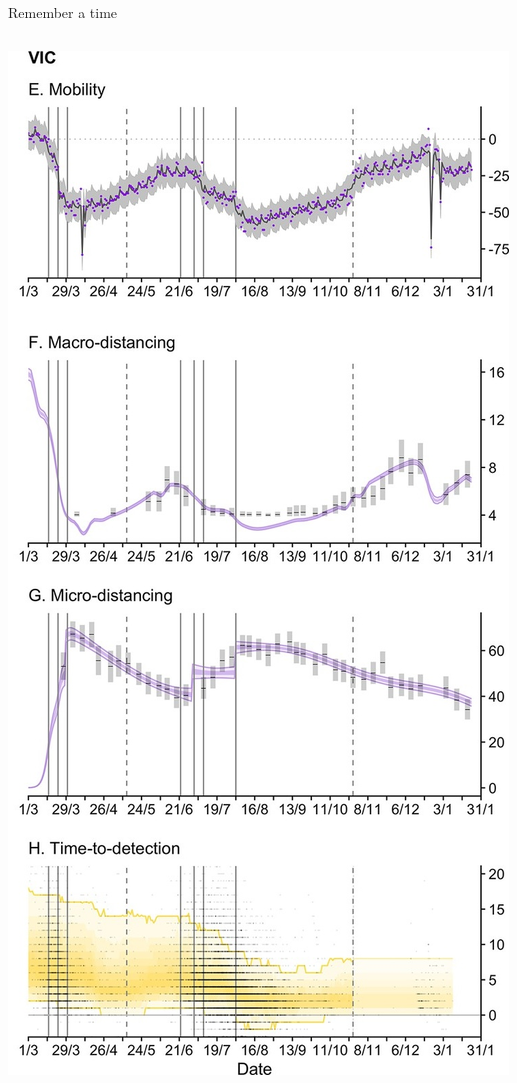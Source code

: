 \documentclass[
  ignorenonframetext,
  aspectratio=149,
]{beamer}
\begin{document}
\begin{frame}{Remember a time}
\begin{columns}[T]
\begin{column}{0.3\textwidth}
\includegraphics{images/lax_78089_elife-78089-fig3-v2.tif.jpg}
\end{column}


\end{columns}
\end{frame}
\end{document}
